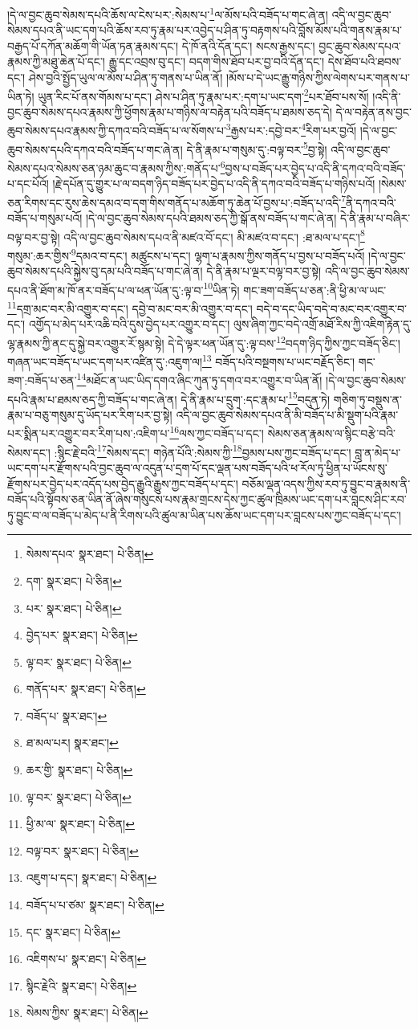།དེ་ལ་བྱང་ཆུབ་སེམས་དཔའི་ཆོས་ལ་ངེས་པར་:སེམས་པ་\footnote{སེམས་དཔའ་  སྣར་ཐང་།  པེ་ཅིན། }ལ་མོས་པའི་བཟོད་པ་གང་ཞེ་ན། འདི་ལ་བྱང་ཆུབ་སེམས་དཔའ་ནི་ཡང་དག་པའི་ཆོས་རབ་ཏུ་རྣམ་པར་འབྱེད་པ་ཤིན་ཏུ་བརྟགས་པའི་བློས་མོས་པའི་གནས་རྣམ་པ་བརྒྱད་པོ་དཀོན་མཆོག་གི་ཡོན་ཏན་རྣམས་དང་། དེ་ཁོ་ནའི་དོན་དང་། སངས་རྒྱས་དང་། བྱང་ཆུབ་སེམས་དཔའ་རྣམས་ཀྱི་མཐུ་ཆེན་པོ་དང་། རྒྱུ་དང་འབྲས་བུ་དང་། བདག་གིས་ཐོབ་པར་བྱ་བའི་དོན་དང་། དེས་ཐོབ་པའི་ཐབས་དང་། ཤེས་བྱའི་སྤྱོད་ཡུལ་ལ་མོས་པ་ཤིན་ཏུ་གནས་པ་ཡིན་ནོ། །མོས་པ་དེ་ཡང་རྒྱུ་གཉིས་ཀྱིས་ལེགས་པར་གནས་པ་ཡིན་ཏེ། ཡུན་རིང་པོ་ནས་གོམས་པ་དང་། ཤེས་པ་ཤིན་ཏུ་རྣམ་པར་:དག་པ་ཡང་དག་\footnote{དག་  སྣར་ཐང་།  པེ་ཅིན། }པར་ཐོབ་པས་སོ། །འདི་ནི་བྱང་ཆུབ་སེམས་དཔའ་རྣམས་ཀྱི་ཕྱོགས་རྣམ་པ་གཉིས་ལ་བརྟེན་པའི་བཟོད་པ་ཐམས་ཅད་དེ། དེ་ལ་བརྟེན་ནས་བྱང་ཆུབ་སེམས་དཔའ་རྣམས་ཀྱི་དཀའ་བའི་བཟོད་པ་ལ་སོགས་པ་\footnote{པར་  སྣར་ཐང་།  པེ་ཅིན། }རྒྱས་པར་:དབྱེ་བར་\footnote{བྱེད་པར་  སྣར་ཐང་།  པེ་ཅིན། }རིག་པར་བྱའོ། །དེ་ལ་བྱང་ཆུབ་སེམས་དཔའི་དཀའ་བའི་བཟོད་པ་གང་ཞེ་ན། དེ་ནི་རྣམ་པ་གསུམ་དུ་:བལྟ་བར་\footnote{ལྟ་བར་  སྣར་ཐང་།  པེ་ཅིན། }བྱ་སྟེ། འདི་ལ་བྱང་ཆུབ་སེམས་དཔའ་སེམས་ཅན་ཉམ་ཆུང་བ་རྣམས་ཀྱིས་:གནོད་པ་\footnote{གནོད་པར་  སྣར་ཐང་།  པེ་ཅིན། }བྱས་པ་བཟོད་པར་བྱེད་པ་འདི་ནི་དཀའ་བའི་བཟོད་པ་དང་པོའོ། །རྗེ་དཔོན་དུ་གྱུར་པ་ལ་བདག་ཉིད་བཟོད་པར་བྱེད་པ་འདི་ནི་དཀའ་བའི་བཟོད་པ་གཉིས་པའོ། །སེམས་ཅན་རིགས་དང་རུས་ཆེས་དམའ་བ་དག་གིས་གནོད་པ་མཆོག་ཏུ་ཆེན་པོ་བྱས་པ་:བཟོད་པ་འདི་\footnote{བཟོད་པ་  སྣར་ཐང་། }ནི་དཀའ་བའི་བཟོད་པ་གསུམ་པའོ། །དེ་ལ་བྱང་ཆུབ་སེམས་དཔའི་ཐམས་ཅད་ཀྱི་སྒོ་ནས་བཟོད་པ་གང་ཞེ་ན། དེ་ནི་རྣམ་པ་བཞིར་བལྟ་བར་བྱ་སྟེ། འདི་ལ་བྱང་ཆུབ་སེམས་དཔའ་ནི་མཛའ་བོ་དང་། མི་མཛའ་བ་དང་། :ཐ་མལ་པ་དང་།\footnote{ཐ་མལ་པར།  སྣར་ཐང་། } གསུམ་:ཆར་གྱིས་\footnote{ཆར་གྱི་  སྣར་ཐང་།  པེ་ཅིན། }དམའ་བ་དང་། མཚུངས་པ་དང་། ལྷག་པ་རྣམས་ཀྱིས་གནོད་པ་བྱས་པ་བཟོད་པའོ། །དེ་ལ་བྱང་ཆུབ་སེམས་དཔའི་སྐྱེས་བུ་དམ་པའི་བཟོད་པ་གང་ཞེ་ན། དེ་ནི་རྣམ་པ་ལྔར་བལྟ་བར་བྱ་སྟེ། འདི་ལ་བྱང་ཆུབ་སེམས་དཔའ་ནི་ཐོག་མ་ཁོ་ནར་བཟོད་པ་ལ་ཕན་ཡོན་དུ་:ལྟ་བ་\footnote{ལྟ་བར་  སྣར་ཐང་།  པེ་ཅིན། }ཡིན་ཏེ། གང་ཟག་བཟོད་པ་ཅན་:ནི་ཕྱི་མ་ལ་ཡང་\footnote{ཕྱི་མ་ལ་  སྣར་ཐང་།  པེ་ཅིན། }དགྲ་མང་བར་མི་འགྱུར་བ་དང་། དབྱེ་བ་མང་བར་མི་འགྱུར་བ་དང་། བདེ་བ་དང་ཡིད་བདེ་བ་མང་བར་འགྱུར་བ་དང་། འགྱོད་པ་མེད་པར་འཆི་བའི་དུས་བྱེད་པར་འགྱུར་བ་དང་། ལུས་ཞིག་ཀྱང་བདེ་འགྲོ་མཐོ་རིས་ཀྱི་འཇིག་རྟེན་དུ་ལྷ་རྣམས་ཀྱི་ནང་དུ་སྐྱེ་བར་འགྱུར་རོ་སྙམ་སྟེ། དེ་དེ་ལྟར་ཕན་ཡོན་དུ་:ལྟ་བས་\footnote{བལྟ་བར་  སྣར་ཐང་།  པེ་ཅིན། }བདག་ཉིད་ཀྱིས་ཀྱང་བཟོད་ཅིང་། གཞན་ཡང་བཟོད་པ་ཡང་དག་པར་འཛིན་དུ་:འཇུག་ལ།\footnote{འཇུག་པ་དང་།  སྣར་ཐང་།  པེ་ཅིན། } བཟོད་པའི་བསྔགས་པ་ཡང་བརྗོད་ཅིང་། གང་ཟག་:བཟོད་པ་ཅན་\footnote{བཟོད་པ་པ་ཙམ་  སྣར་ཐང་།  པེ་ཅིན། }མཐོང་ན་ཡང་ཡིད་དགའ་ཞིང་ཀུན་ཏུ་དགའ་བར་འགྱུར་བ་ཡིན་ནོ། །དེ་ལ་བྱང་ཆུབ་སེམས་དཔའི་རྣམ་པ་ཐམས་ཅད་ཀྱི་བཟོད་པ་གང་ཞེ་ན། དེ་ནི་རྣམ་པ་དྲུག་:དང་རྣམ་པ་\footnote{དང་  སྣར་ཐང་།  པེ་ཅིན། }བདུན་ཏེ། གཅིག་ཏུ་བསྡུས་ན་རྣམ་པ་བཅུ་གསུམ་དུ་ཡོད་པར་རིག་པར་བྱ་སྟེ། འདི་ལ་བྱང་ཆུབ་སེམས་དཔའ་ནི་མི་བཟོད་པ་མི་སྡུག་པའི་རྣམ་པར་སྨིན་པར་འགྱུར་བར་རིག་པས་:འཇིག་པ་\footnote{འཇིགས་པ་  སྣར་ཐང་།  པེ་ཅིན། }ལས་ཀྱང་བཟོད་པ་དང་། སེམས་ཅན་རྣམས་ལ་སྙིང་བརྩེ་བའི་སེམས་དང་། :སྙིང་རྗེ་བའི་\footnote{སྙིང་རྗེའི་  སྣར་ཐང་།  པེ་ཅིན། }སེམས་དང་། གཉེན་པོའི་:སེམས་ཀྱི་\footnote{སེམས་ཀྱིས་  སྣར་ཐང་།  པེ་ཅིན། }བྱམས་པས་ཀྱང་བཟོད་པ་དང་། བླ་ན་མེད་པ་ཡང་དག་པར་རྫོགས་པའི་བྱང་ཆུབ་ལ་འདུན་པ་དྲག་པོ་དང་ལྡན་པས་བཟོད་པའི་ཕ་རོལ་ཏུ་ཕྱིན་པ་ཡོངས་སུ་རྫོགས་པར་བྱེད་པར་འདོད་པས་བྱེད་རྒྱུའི་རྒྱུས་ཀྱང་བཟོད་པ་དང་། བཅོམ་ལྡན་འདས་ཀྱིས་རབ་ཏུ་བྱུང་བ་རྣམས་ནི་བཟོད་པའི་སྟོབས་ཅན་ཡིན་ནོ་ཞེས་གསུངས་པས་རྣམ་གྲངས་དེས་ཀྱང་ཚུལ་ཁྲིམས་ཡང་དག་པར་བླངས་ཤིང་རབ་ཏུ་བྱུང་བ་ལ་བཟོད་པ་མེད་པ་ནི་རིགས་པའི་ཚུལ་མ་ཡིན་པས་ཆོས་ཡང་དག་པར་བླངས་པས་ཀྱང་བཟོད་པ་དང་། 